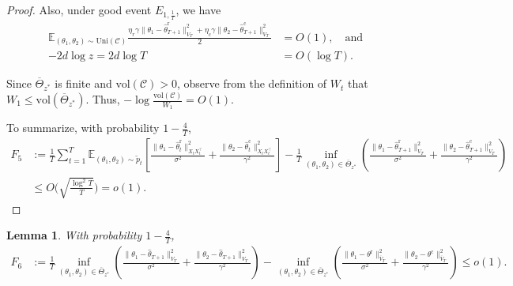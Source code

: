 \documentclass[accepted]{uai2025} %
\theoremstyle{plain}
\newtheorem{lemma}[theorem]{Lemma}
\theoremstyle{definition}
\theoremstyle{remark}
\newcommand{\thetac}{\theta^{\mathrm{c}}}
\newcommand{\thetar}{\theta^{\mathrm{r}}}
\newcommand{\EE}{\mathbb{E}} %
\begin{document}
\begin{proof}
Also, under good event $E_{1, \frac{1}{T}}$, we have 
\begin{align*}
     \EE_{(\theta_1, \theta_2)\sim \text{Uni}(\mathcal{C})} \frac{\eta_r \gamma \| \theta_1 - \hat{\theta}_{T+1}^\mathrm{r} \|^2_{V_T}+\eta_c \gamma \| \theta_2 - \hat{\theta}_{T+1}^\mathrm{c} \|^2_{V_T}}{2}&=O(1),\quad\mbox{and}\\
    -2d\log z=2d\log T&=O(\log T).
\end{align*}

Since $\overline{\Theta}_{z^*}$ is finite and $\text{vol}(\mathcal{C})>0$, observe from   the definition of $W_t$ that $W_1\le \text{vol}(\overline{\Theta}_{z^*})$. Thus,   $-\log \frac{\text{vol}(\mathcal{C})}{W_{1}}=O(1)$.

To summarize, with probability $1-\frac{4}{T}$,
\begin{align*}
        F_5 &:= \frac{1}{T} \sum_{t=1}^{T} \mathbb{E}_{(\theta_1, \theta_2) \sim \tilde{p}_t} 
        \left[ \frac{\|\theta_1 \!-\! \hat{\theta}_t^{\mathrm{r}}\|_{X_t X_t^\top}^2}{\sigma^2} 
       \! + \!\frac{\|\theta_2 \!-\! \hat{\theta}_t^{\mathrm{c}}\|_{X_t X_t^\top}^2}{\gamma^2} \right]   - \frac{1}{T} \inf_{(\theta_1, \theta_2) \in \overline{\Theta}_{z^*}} 
        \left( \frac{\|\theta_1 \! -\! \hat{\theta}^{\mathrm{r}}_{T + 1}\|_{V_{T}}^2}{\sigma^2} 
        \!+\! \frac{\|\theta_2 \!-\! \hat{\theta}^{\mathrm{c}}_{T + 1}\|_{V_{T}}^2}{\gamma^2} \right) \\
        &\le O\Big(\sqrt{\frac{\log^2 T}{T}}\Big) = o(1).
    \end{align*}




\end{proof}





\begin{lemma}
\label{lem:Regret_F6}
With probability \( 1 - \frac{4}{T} \),
\begin{align*}
F_6 
&:= \frac{1}{T} \inf_{(\theta_1, \theta_2) \in \overline{\Theta}_{z^*}} 
\left( \frac{\|\theta_1 - \hat{\theta}_{T+1}\|_{V_{T}}^2}{\sigma^2} 
+ \frac{\|\theta_2 - \hat{\theta}_{T+1}\|_{{V}_{T}}^2}{\gamma^2} \right)   - \inf_{(\theta_1, \theta_2) \in \overline{\Theta}_{z^*}} 
\left( \frac{\|\theta_1 - \thetar\|_{\overline{V}_T}^2}{\sigma^2} 
+ \frac{\|\theta_2 - \thetac\|_{\overline{V}_T}^2}{\gamma^2} \right) \le o(1).
\end{align*}
\end{lemma}
\end{document}
